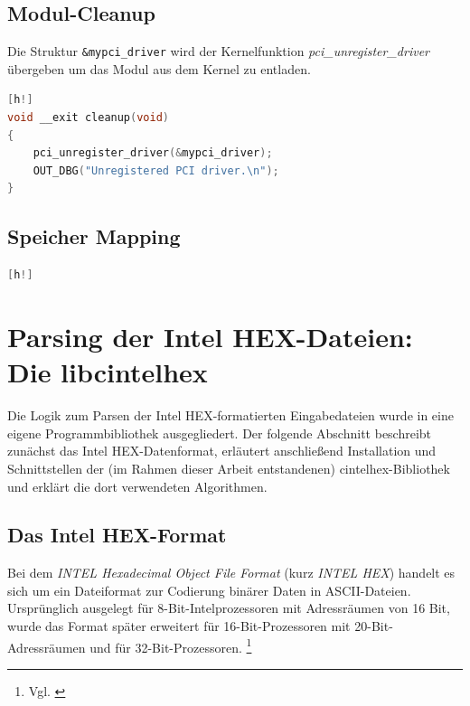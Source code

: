 \documentclass[11pt]{scrartcl}
\begin{document}
\subsection{Modul-Cleanup}
Die Struktur \texttt{\&mypci\_driver} wird der Kernelfunktion \textit{pci\_unregister\_driver} übergeben um das Modul aus dem Kernel zu entladen. 

\begin{lstlisting}[language=C, firstnumber=67, label=modzpu_cleanupfunc, caption=modzpu Cleanup-Funktion][h!]
void __exit cleanup(void)
{
	pci_unregister_driver(&mypci_driver);
	OUT_DBG("Unregistered PCI driver.\n");
}
\end{lstlisting}

\subsection{Speicher Mapping}

\begin{lstlisting}[language=C, firstnumber=67, label=modzpu_mmap, caption=modzpu Cleanup-Funktion][h!]

\end{lstlisting}

\pagebreak
\section{Parsing der Intel HEX-Dateien: Die libcintelhex}
\label{chapter_libcintelhex}

Die Logik zum Parsen der Intel HEX-formatierten Eingabedateien wurde in eine eigene Programmbibliothek ausgegliedert. Der folgende Abschnitt beschreibt zunächst das Intel HEX-Datenformat, erläutert anschließend Installation und Schnittstellen der (im Rahmen dieser Arbeit entstandenen) cintelhex-Bibliothek und erklärt die dort verwendeten Algorithmen.

\subsection{Das Intel HEX-Format}

Bei dem \emph{INTEL Hexadecimal Object File Format} (kurz \emph{INTEL HEX}) handelt es sich um ein Dateiformat zur Codierung binärer Daten in ASCII-Dateien. Ursprünglich ausgelegt für 8-Bit-Intelprozessoren mit Adressräumen von 16 Bit, wurde das Format später erweitert für 16-Bit-Prozessoren mit 20-Bit-Adressräumen und für 32-Bit-Prozessoren.
\footnote{Vgl. \cite[S. 4]{intelhex}}
\end{document}
